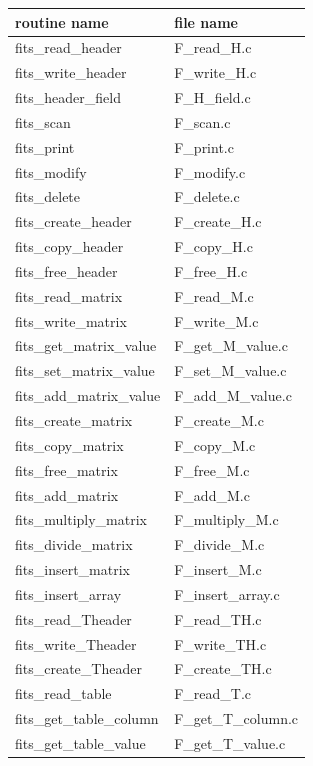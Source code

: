 \begin{center}
\begin{tabular}{ll}
\hline
routine name               &   file name \\
\hline
fits\_read\_header         &   F\_read\_H.c            \\
fits\_write\_header        &   F\_write\_H.c           \\
fits\_header\_field        &   F\_H\_field.c           \\
fits\_scan                 &   F\_scan.c               \\
fits\_print                &   F\_print.c              \\
fits\_modify               &   F\_modify.c             \\
fits\_delete               &   F\_delete.c             \\
fits\_create\_header       &   F\_create\_H.c          \\
fits\_copy\_header         &   F\_copy\_H.c            \\
fits\_free\_header         &   F\_free\_H.c            \\
\hline
fits\_read\_matrix         &   F\_read\_M.c            \\
fits\_write\_matrix        &   F\_write\_M.c           \\
fits\_get\_matrix\_value   &   F\_get\_M\_value.c      \\
fits\_set\_matrix\_value   &   F\_set\_M\_value.c      \\
fits\_add\_matrix\_value   &   F\_add\_M\_value.c      \\
fits\_create\_matrix       &   F\_create\_M.c          \\
fits\_copy\_matrix         &   F\_copy\_M.c            \\
fits\_free\_matrix         &   F\_free\_M.c            \\
fits\_add\_matrix          &   F\_add\_M.c             \\
fits\_multiply\_matrix     &   F\_multiply\_M.c        \\
fits\_divide\_matrix       &   F\_divide\_M.c          \\
fits\_insert\_matrix       &   F\_insert\_M.c          \\
fits\_insert\_array        &   F\_insert\_array.c      \\
\hline
fits\_read\_Theader        &   F\_read\_TH.c           \\
fits\_write\_Theader       &   F\_write\_TH.c          \\
fits\_create\_Theader      &   F\_create\_TH.c         \\
fits\_read\_table          &   F\_read\_T.c            \\
fits\_get\_table\_column   &   F\_get\_T\_column.c     \\
fits\_get\_table\_value    &   F\_get\_T\_value.c      \\
\hline
\end{tabular}
\end{center}



